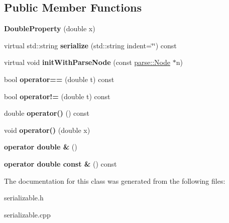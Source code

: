 \subsection*{Public Member Functions}
\begin{DoxyCompactItemize}
\item 
\hypertarget{classg2c_1_1_double_property_a06be4c1ebf4ca027d8f4d843f42a78aa}{
{\bfseries DoubleProperty} (double x)}
\label{classg2c_1_1_double_property_a06be4c1ebf4ca027d8f4d843f42a78aa}

\item 
\hypertarget{classg2c_1_1_double_property_a3c585d2853693e8fe944fbc6eaeffbcf}{
virtual std::string {\bfseries serialize} (std::string indent=\char`\"{}\char`\"{}) const }
\label{classg2c_1_1_double_property_a3c585d2853693e8fe944fbc6eaeffbcf}

\item 
\hypertarget{classg2c_1_1_double_property_a9142cfcebfeca44ee6214a70b0573646}{
virtual void {\bfseries initWithParseNode} (const \hyperlink{classparse_1_1_node}{parse::Node} $\ast$n)}
\label{classg2c_1_1_double_property_a9142cfcebfeca44ee6214a70b0573646}

\item 
\hypertarget{classg2c_1_1_double_property_af051aa7b216ed9342355cbcd42d6594a}{
bool {\bfseries operator==} (double t) const }
\label{classg2c_1_1_double_property_af051aa7b216ed9342355cbcd42d6594a}

\item 
\hypertarget{classg2c_1_1_double_property_a15931d4718650131417069ebebf64194}{
bool {\bfseries operator!=} (double t) const }
\label{classg2c_1_1_double_property_a15931d4718650131417069ebebf64194}

\item 
\hypertarget{classg2c_1_1_double_property_a4d8032444533ab67842bac7bc62aa818}{
double {\bfseries operator()} () const }
\label{classg2c_1_1_double_property_a4d8032444533ab67842bac7bc62aa818}

\item 
\hypertarget{classg2c_1_1_double_property_ac5f0d9704a186960e7af8f559bb46e9b}{
void {\bfseries operator()} (double x)}
\label{classg2c_1_1_double_property_ac5f0d9704a186960e7af8f559bb46e9b}

\item 
\hypertarget{classg2c_1_1_double_property_a2cfa1646b9425b5edd8909689af1d2bf}{
{\bfseries operator double \&} ()}
\label{classg2c_1_1_double_property_a2cfa1646b9425b5edd8909689af1d2bf}

\item 
\hypertarget{classg2c_1_1_double_property_a87af6f1429ad43df5655dc5ff35418be}{
{\bfseries operator double const \&} () const }
\label{classg2c_1_1_double_property_a87af6f1429ad43df5655dc5ff35418be}

\end{DoxyCompactItemize}


The documentation for this class was generated from the following files:\begin{DoxyCompactItemize}
\item 
serializable.h\item 
serializable.cpp\end{DoxyCompactItemize}
